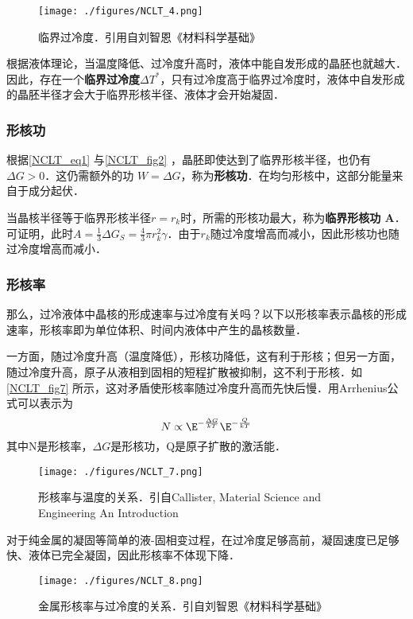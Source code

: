 \begin{figure}[ht]
\centering
\texttt{[image: ./figures/NCLT\_4.png]}
\caption{临界过冷度．引用自刘智恩《材料科学基础》} \label{NCLT_fig4}
\end{figure}
根据液体理论，当温度降低、过冷度升高时，液体中能自发形成的晶胚也就越大．因此，存在一个\textbf{临界过冷度$\Delta T^*$}，只有过冷度高于临界过冷度时，液体中自发形成的晶胚半径才会大于临界形核半径、液体才会开始凝固．

\subsubsection{形核功}
根据\autoref{NCLT_eq1} 与\autoref{NCLT_fig2} ，晶胚即使达到了临界形核半径，也仍有$\Delta G>0$．这仍需额外的功 $W=\Delta G$，称为\textbf{形核功}．在均匀形核中，这部分能量来自于成分起伏．

当晶核半径等于临界形核半径$r=r_k$时，所需的形核功最大，称为\textbf{临界形核功 A}．可证明，此时$A=\frac{1}{3}\Delta G_S=\frac{4}{3}\pi r_k^2 \gamma$．由于$r_k$随过冷度增高而减小，因此形核功也随过冷度增高而减小．%

\subsubsection{形核率}
那么，过冷液体中晶核的形成速率与过冷度有关吗？以下以形核率表示晶核的形成速率，形核率即为单位体积、时间内液体中产生的晶核数量．%

一方面，随过冷度升高（温度降低），形核功降低，这有利于形核；但另一方面，随过冷度升高，原子从液相到固相的短程扩散被抑制，这不利于形核．如\autoref{NCLT_fig7} 所示，这对矛盾使形核率随过冷度升高而先快后慢．用Arrhenius公式可以表示为
$$N \propto \E^{-\frac{\Delta G}{kT}} \E^{-\frac{Q}{kT}}$$
其中N是形核率，$\Delta G$是形核功，Q是原子扩散的激活能．
\begin{figure}[ht]
\centering
\texttt{[image: ./figures/NCLT\_7.png]}
\caption{形核率与温度的关系．引自Callister, Material Science and Engineering An Introduction} \label{NCLT_fig7}
\end{figure}

对于纯金属的凝固等简单的液-固相变过程，在过冷度足够高前，凝固速度已足够快、液体已完全凝固，因此形核率不体现下降．
\begin{figure}[ht]
\centering
\texttt{[image: ./figures/NCLT\_8.png]}
\caption{金属形核率与过冷度的关系．引自刘智恩《材料科学基础》} \label{NCLT_fig8}
\end{figure}

